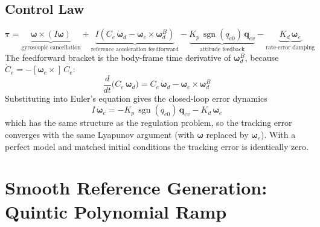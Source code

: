 \documentclass[11pt, a4paper]{article}
\newcommand{\vect}[1]{\boldsymbol{#1}}
\newcommand{\w}{\vect{\omega}}
\newcommand{\sgn}{\operatorname{sgn}}
\begin{document}
\subsection{Control Law}
\begin{equation}
\vect{\tau} =
\underbrace{\w \times (I\w)}_{\text{gyroscopic cancellation}}
+ \underbrace{I \left( C_e\, \dot{\w}_d - \w_e \times \w_d^B \right)}_{\text{reference acceleration feedforward}}
- \underbrace{K_p\, \sgn(q_{e0})\, \vect{q}_{ev}}_{\text{attitude feedback}}
- \underbrace{K_d\, \w_e}_{\text{rate-error damping}}
\end{equation}
The feedforward bracket is the body-frame time derivative of $\w_d^B$, because $\dot{C}_e = -[\w_e \times]\, C_e$:
\begin{equation}
\frac{d}{dt}\big( C_e\, \w_d \big) = C_e\, \dot{\w}_d - \w_e \times \w_d^B
\end{equation}
Substituting into Euler's equation gives the closed-loop error dynamics
\begin{equation}
I\, \dot{\w}_e = -K_p\, \sgn(q_{e0})\, \vect{q}_{ev} - K_d\, \w_e
\end{equation}
which has the same structure as the regulation problem, so the tracking error converges with the same Lyapunov argument (with $\w$ replaced by $\w_e$). With a perfect model and matched initial conditions the tracking error is identically zero.

\section{Smooth Reference Generation: Quintic Polynomial Ramp}
\end{document}
